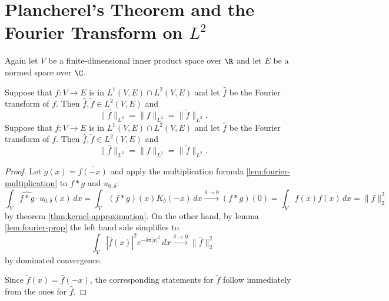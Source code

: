 \section{\texorpdfstring{Plancherel's Theorem and the Fourier Transform on $L^2$}
                        {Plancherel's Theorem and the Fourier Transform on L2}}
Again let $V$ be a finite-dimensional inner product space over $\R$ and let $E$ be a normed space over $\C$.
\begin{theorem}
  \label{thm:plancherel}
  \leanok %
   Suppose that $f : V \to E$ is in $L^1(V,E)\cap L^2(V,E)$ and let $\widehat{f}$ be the Fourier transform of $f$. Then $\widehat{f},\check{f}\in L^2(V,E)$ and
  \[\|\widehat{f}\|_{L^2} = \|f\|_{L^2}=\|\check f\|_{L^2}.\]
   Suppose that $f : V \to E$ is in $L^1(V,E)\cap L^2(V,E)$ and let $\widehat{f}$ be the Fourier transform of $f$. Then $\widehat{f},\check{f}\in L^2(V,E)$ and
  \[\|\widehat{f}\|_{L^2} = \|f\|_{L^2}=\|\check f\|_{L^2}.\]
  \end{theorem}
    \begin{proof}
    Let $g(x)=\overline{f(-x)}$ and apply the multiplication formula \ref{lem:fourier-multiplication}
    to $f\ast g$ and $u_{0,\delta}$: $$\int_V\widehat{f\ast g}\cdot u_{0,\delta}(x)\,dx=\int_V(f\ast g)(x)K_\delta(-x)\,dx
    \overset{\delta\to0}\to(f\ast g)(0)=\int_Vf(x)\overline{f(x)}\,dx=\| f\|_2^2$$ by theorem \ref{thm:kernel-approximation}.
    On the other hand, by lemma \ref{lem:fourier-prop} the left hand side simplifies to
    $$\int_V|\widehat f(x)|^2e^{-\delta\pi|x|^2}\,dx\xrightarrow{\delta\to0}\|\widehat f\|_2^2$$ by dominated convergence.

    Since $\check f(x)=\widehat f(-x)$, the corresponding statements for $\check f$ follow immediately from the ones for $\widehat f$.
\end{proof}

